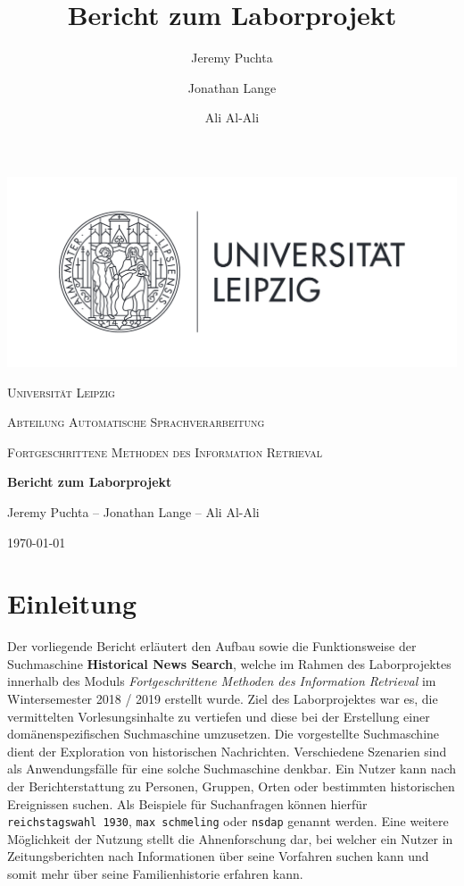 \documentclass[11pt,a4paper, halfparskip]{scrartcl}
\title{Bericht zum Laborprojekt}
\author{Jeremy Puchta \and Jonathan Lange \and Ali Al-Ali}
\begin{document}
\begin{titlepage}
	\centering
	\includegraphics[width=1\textwidth]{Unilogo}\par\vspace{1cm}
	{\scshape\LARGE Universität Leipzig \par}
	\vspace{0.5cm}
	{\scshape\Large Abteilung Automatische Sprachverarbeitung\par}
	\vspace{0.2cm}
	{\scshape\large Fortgeschrittene Methoden des Information Retrieval\par}
	\vspace{1cm}
	{\huge\bfseries Bericht zum Laborprojekt\par}
	\vspace{1cm}
	{\Large Jeremy Puchta -- Jonathan Lange -- Ali Al-Ali \par}

	\vfill
	
	{\large \today\par}
\end{titlepage}

\newpage

\thispagestyle{empty}
\tableofcontents

\newpage
{}
\section{Einleitung}

Der vorliegende Bericht erläutert den Aufbau sowie die Funktionsweise der Suchmaschine \textbf{Historical News Search}, welche im Rahmen des Laborprojektes innerhalb des Moduls \textit{Fortgeschrittene Methoden des Information Retrieval} im Wintersemester 2018 / 2019 erstellt wurde. 
Ziel des Laborprojektes war es, die vermittelten Vorlesungsinhalte zu vertiefen und diese bei der Erstellung einer domänenspezifischen Suchmaschine umzusetzen. 
Die vorgestellte Suchmaschine dient der Exploration von historischen Nachrichten.
Verschiedene Szenarien sind als Anwendungsfälle für eine solche Suchmaschine denkbar. 
Ein Nutzer kann nach der Berichterstattung zu Personen, Gruppen, Orten oder bestimmten historischen Ereignissen suchen.
Als Beispiele für Suchanfragen können hierfür \texttt{reichstagswahl 1930}, \texttt{max schmeling} oder \texttt{nsdap} genannt werden.
Eine weitere Möglichkeit der Nutzung stellt die Ahnenforschung dar, bei welcher ein Nutzer in Zeitungsberichten nach Informationen über seine Vorfahren suchen kann und somit mehr über seine Familienhistorie erfahren kann.
\end{document}
